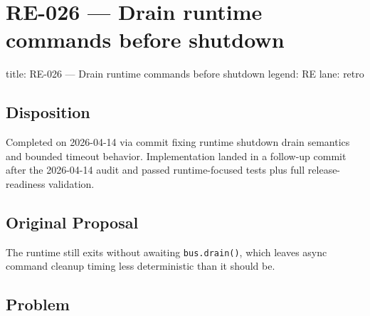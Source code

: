 \chapter{RE-026 --- Drain runtime commands before shutdown}\label{record-384}

\smallskip

\begin{RecordMeta}
title: RE-026 — Drain runtime commands before shutdown
legend: RE
lane: retro

\end{RecordMeta}

\section{Disposition}\label{record-384-disposition}

Completed on 2026-04-14 via commit fixing runtime shutdown drain semantics and bounded timeout behavior. Implementation landed in a follow-up commit after the 2026-04-14 audit and passed runtime-focused tests plus full release-readiness validation.

\section{Original Proposal}\label{record-384-original-proposal}

The runtime still exits without awaiting \texttt{b\allowbreak{}u\allowbreak{}s\allowbreak{}.\allowbreak{}d\allowbreak{}r\allowbreak{}a\allowbreak{}i\allowbreak{}n\allowbreak{}(\allowbreak{})}, which leaves async command cleanup timing less deterministic than it should be.

\section{Problem}\label{record-384-problem}

